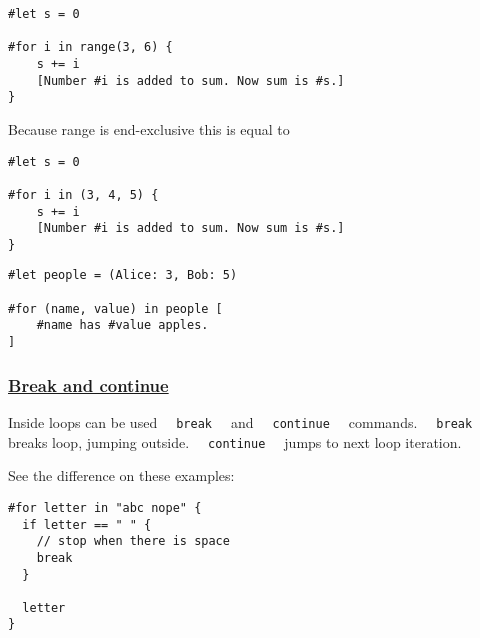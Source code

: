 \begin{verbatim}
#let s = 0

#for i in range(3, 6) {
    s += i
    [Number #i is added to sum. Now sum is #s.]
}
\end{verbatim}

\pandocbounded{}

Because range is end-exclusive this is equal to

\begin{verbatim}
#let s = 0

#for i in (3, 4, 5) {
    s += i
    [Number #i is added to sum. Now sum is #s.]
}
\end{verbatim}

\pandocbounded{}

\begin{verbatim}
#let people = (Alice: 3, Bob: 5)

#for (name, value) in people [
    #name has #value apples.
]
\end{verbatim}

\pandocbounded{}

\subsubsection{\texorpdfstring{\hyperref[break-and-continue]{Break and
continue}}{Break and continue}}\label{break-and-continue}

Inside loops can be used \texttt{\ }{\texttt{\ break\ }}\texttt{\ } and
\texttt{\ }{\texttt{\ continue\ }}\texttt{\ } commands.
\texttt{\ }{\texttt{\ break\ }}\texttt{\ } breaks loop, jumping outside.
\texttt{\ }{\texttt{\ continue\ }}\texttt{\ } jumps to next loop
iteration.

See the difference on these examples:

\begin{verbatim}
#for letter in "abc nope" {
  if letter == " " {
    // stop when there is space
    break
  }

  letter
}
\end{verbatim}

\pandocbounded{}

